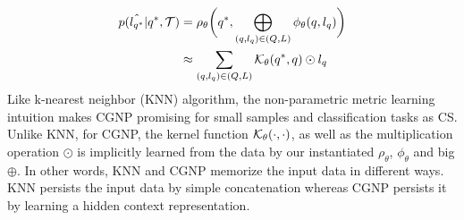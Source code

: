 %
\begin{align}
\label{eq:cnp:kernel1}
p(\hat{l_{q^*}} |q^*, \mathcal{T}) &= \rho_\theta \biggl(q^*, \bigoplus_{(q, l_q) \in (Q, L)}  \phi_\theta(q, l_q) \biggr) \\
\label{eq:cnp:kernel2}
&\approx \sum_{(q, l_q) \in (Q, L)} \mathcal{K}_\theta(q^*, q) \odot l_q 
\end{align}
Like k-nearest neighbor (KNN) algorithm, the non-parametric metric learning intuition makes CGNP promising for small samples and classification tasks as CS.
Unlike KNN, for CGNP, the kernel function $\mathcal{K}_\theta(\cdot,\cdot)$, as well as the multiplication operation $\odot$ is implicitly learned from the data by our instantiated $\rho_\theta$, $\phi_\theta$ and big $\oplus$. 
In other words, KNN and CGNP memorize the input data in different ways. KNN persists the input data by simple concatenation whereas CGNP persists it by learning a hidden context representation.




